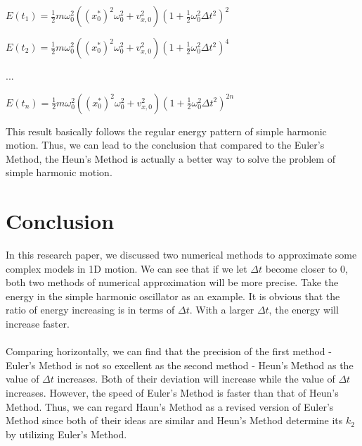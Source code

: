 \documentclass[12pt]{report}
\begin{document}
\newline\centerline{$E(t_{1})=\frac{1}{2}m\omega_{0}^2((x_{0}^*)^2\omega_{0}^2+v_{x,0}^2)(1+\frac{1}{2}\omega_{0}^2\Delta t^2)^2$}
\newline\centerline{$E(t_{2})=\frac{1}{2}m\omega_{0}^2((x_{0}^*)^2\omega_{0}^2+v_{x,0}^2)(1+\frac{1}{2}\omega_{0}^2\Delta t^2)^4$}
\newline\centerline{...}
\newline\centerline{$E(t_{n})=\frac{1}{2}m\omega_{0}^2((x_{0}^*)^2\omega_{0}^2+v_{x,0}^2)(1+\frac{1}{2}\omega_{0}^2\Delta t^2)^{2n}$}
This result basically follows the regular energy pattern of simple harmonic motion. Thus, we can lead to the conclusion that compared to the Euler's Method, the Heun's Method is actually a better way to solve the problem of simple harmonic motion.
\clearpage
\section{Conclusion}
In this research paper, we discussed two numerical methods to approximate some complex models in 1D motion. We can see that if we let $\Delta t$ become closer to 0, both two methods of numerical approximation will be more precise. Take the energy in the simple harmonic oscillator as an example. It is obvious that the ratio of energy increasing is in terms of $\Delta t$. With a larger $\Delta t$, the energy will increase faster.
\paragraph{}Comparing horizontally, we can find that the precision of the first method - Euler's Method is not so excellent as the second method - Heun's Method as the value of $\Delta t$ increases. Both of their deviation will increase while the value of $\Delta t$ increases. However, the speed of Euler's Method is faster than that of Heun's Method. Thus, we can regard Haun's Method as a revised version of Euler's Method since both of their ideas are similar and Heun's Method determine its $k_{2}$ by utilizing Euler's Method.
\renewcommand\bibname{References} 
\printbibliography
\end{document}
